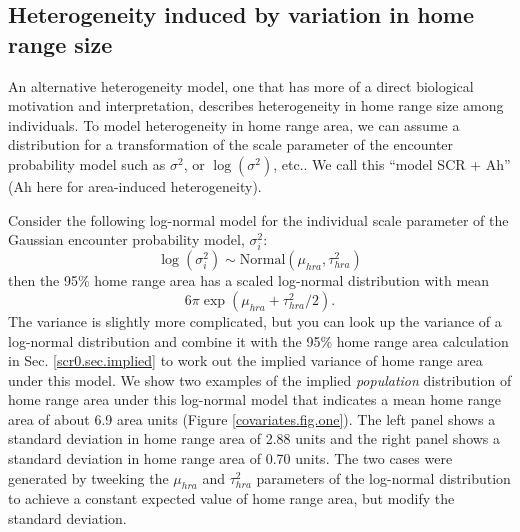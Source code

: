 \subsection{Heterogeneity induced by variation in home range size} 
\label{covariates.sec.heterogeneityHR}

An alternative heterogeneity model, one that has more of a direct
biological motivation and interpretation, describes heterogeneity in
home range size among individuals.  To model heterogeneity in home
range area, we can assume a distribution for a transformation of the
scale parameter of the encounter probability model such as
$\sigma^{2}$, or $\log(\sigma^2)$, etc..  We call this ``model SCR +
Ah'' (Ah here for area-induced heterogeneity).

Consider the following log-normal model for the individual scale parameter
of the Gaussian encounter probability model, $\sigma_{i}^{2}$:
\[
 \log(\sigma^{2}_{i}) \sim \mbox{Normal}(\mu_{hra}, \tau^{2}_{hra})
\]
then the 95\% home range area has a scaled
log-normal distribution with mean 
\[
6 \pi \exp(\mu_{hra} + \tau^{2}_{hra}/2). 
\]
The variance is slightly more complicated, but you can look up the
variance of a log-normal distribution and combine it with the 95\%
home range area calculation in Sec. \ref{scr0.sec.implied} to work out
the implied variance of home range area under this model.  We show two
examples of the implied {\it population} distribution of home range
area under this log-normal model that indicates a mean home range area
of about 6.9 area units (Figure \ref{covariates.fig.one}). The left
panel shows a standard deviation in home range area of 2.88 units and
the right panel shows a standard deviation in home range area of 0.70
units. The two cases were generated by tweeking the $\mu_{hra}$ and
$\tau^{2}_{hra}$ parameters of the log-normal distribution to achieve
a constant expected value of home range area, but modify the standard
deviation.




